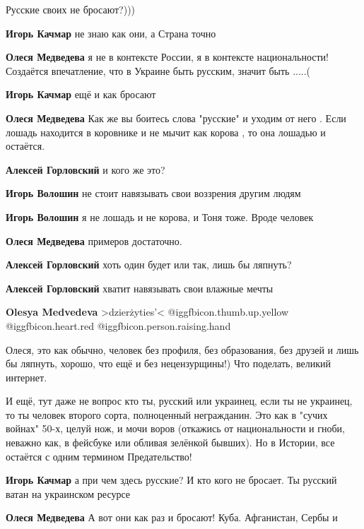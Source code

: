 \begin{itemize}
Русские своих не бросают?)))

\begin{itemize} %
\textbf{Игорь Качмар} не знаю как они, а Страна точно

\textbf{Олеся Медведева} я не в контексте России, я в контексте национальности! Создаётся впечатление, что в Украине быть русским, значит быть .....(

\textbf{Игорь Качмар} ещё и как бросают

\textbf{Олеся Медведева}
Как же вы боитесь слова "русские" и уходим от него .
Если лошадь находится в коровнике и не мычит как корова , то она лошадью и остаётся.

\textbf{Алексей Горловский} и кого же это?

\textbf{Игорь Волошин} не стоит навязывать свои воззрения другим людям

\textbf{Игорь Волошин} я не лошадь и не корова, и Тоня тоже. Вроде человек

\textbf{Олеся Медведева} примеров достаточно.

\textbf{Алексей Горловский} хоть один будет или так, лишь бы ляпнуть?

\textbf{Алексей Горловский} хватит навязывать свои влажные мечты

\textbf{Olesya Medvedeva} >dzierżyties'<  @igg{fbicon.thumb.up.yellow} @igg{fbicon.heart.red} @igg{fbicon.person.raising.hand} 

Олеся, это как обычно, человек без профиля, без образования, без друзей и лишь бы ляпнуть, хорошо, что ещё и без нецензурщины!) Что поделать, великий интернет.


И ещё, тут даже не вопрос кто ты, русский или украинец, если ты не украинец, то
ты человек второго сорта, полноценный негражданин. Это как в "сучих войнах"
50-х, целуй нож, и мочи воров (откажись от национальности и гноби, неважно как,
в фейсбуке или обливая зелёнкой бывших). Но в Истории, все остаётся с одним
термином Предательство!

\textbf{Игорь Качмар} а при чем здесь русские? И кто кого не бросает. Ты русский ватан на украинском ресурсе

\textbf{Олеся Медведева} А вот они как раз и бросают! Куба. Афганистан, Сербы и


\end{itemize}
\end{itemize}
